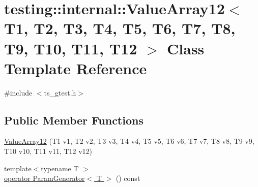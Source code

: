 \hypertarget{classtesting_1_1internal_1_1ValueArray12}{\section{testing\-:\-:internal\-:\-:Value\-Array12$<$ T1, T2, T3, T4, T5, T6, T7, T8, T9, T10, T11, T12 $>$ Class Template Reference}
\label{classtesting_1_1internal_1_1ValueArray12}
}


{\ttfamily \#include $<$ts\-\_\-gtest.\-h$>$}

\subsection*{Public Member Functions}
\begin{DoxyCompactItemize}
\item 
\hyperlink{classtesting_1_1internal_1_1ValueArray12_aaebe12df41b8122fd03f5d6aa1c820a7}{Value\-Array12} (T1 v1, T2 v2, T3 v3, T4 v4, T5 v5, T6 v6, T7 v7, T8 v8, T9 v9, T10 v10, T11 v11, T12 v12)
\item 
{\footnotesize template$<$typename T $>$ }\\\hyperlink{classtesting_1_1internal_1_1ValueArray12_aba607bff7adc38033e09ca8be6a0daee}{operator Param\-Generator$<$ T $>$} () const 
\end{DoxyCompactItemize}


